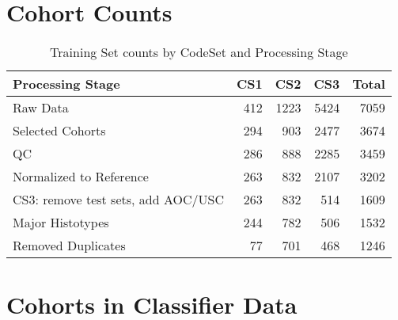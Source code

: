\documentclass[
]{report}
\begin{document}
\hypertarget{cohort-counts}{%
\section{Cohort Counts}\label{cohort-counts}}

\begin{table}

\caption{\label{tab:cohort-counts}Training Set counts by CodeSet and Processing Stage}
\centering
\begin{tabular}[t]{l|r|r|r|r}
\hline
Processing Stage & CS1 & CS2 & CS3 & Total\\
\hline
Raw Data & 412 & 1223 & 5424 & 7059\\
\hline
Selected Cohorts & 294 & 903 & 2477 & 3674\\
\hline
QC & 286 & 888 & 2285 & 3459\\
\hline
Normalized to Reference & 263 & 832 & 2107 & 3202\\
\hline
CS3: remove test sets, add AOC/USC & 263 & 832 & 514 & 1609\\
\hline
Major Histotypes & 244 & 782 & 506 & 1532\\
\hline
Removed Duplicates & 77 & 701 & 468 & 1246\\
\hline
\end{tabular}
\end{table}

\hypertarget{cohorts-in-classifier-data}{%
\section{Cohorts in Classifier Data}\label{cohorts-in-classifier-data}}
\end{document}
